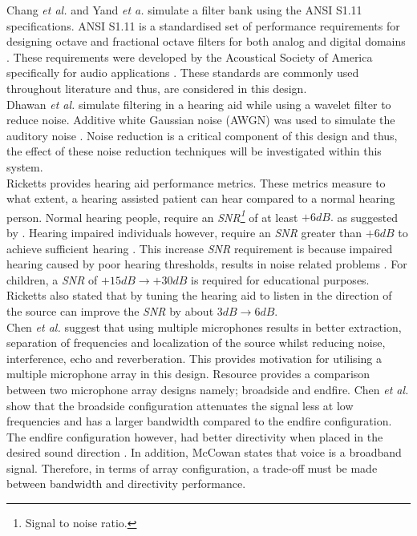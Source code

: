 \documentclass[12pt, onecolumn]{article}
\begin{document}
\newline
\noindent Chang \textit{et al.} \cite{chang} and Yand \textit{et a.} \cite{ansiAtten} simulate a filter bank using the ANSI S1.11 specifications. ANSI S1.11 is a standardised set of performance requirements for designing octave and fractional octave filters for both analog and digital domains \cite{ansiDoc}. These requirements were developed by the Acoustical Society of America specifically for audio applications \cite{ansiDoc}. These standards are commonly used throughout literature and thus, are considered in this design.\\
\newline
\noindent Dhawan \textit{et al.} simulate filtering in a hearing aid while using a wavelet filter to reduce noise. Additive white Gaussian noise (AWGN) was used to simulate the auditory noise \cite{dhawan}. Noise reduction is a critical component of this design and thus, the effect of these noise reduction techniques will be investigated within this system. \\
\newline
\noindent Ricketts \cite{ricketts} provides hearing aid performance metrics. These metrics measure to what extent, a hearing assisted patient can hear compared to a normal hearing person. Normal hearing people, require an \textit{SNR\footnote{Signal to noise ratio.}} of at least $+6dB.$ as suggested by \cite{moore}. Hearing impaired individuals however, require an \textit{SNR} greater than $+6dB$ to achieve sufficient hearing \cite{tillman}. This increase \textit{SNR} requirement is because impaired hearing caused by poor hearing thresholds, results in noise related problems \cite{ricketts}. For children, a \textit{SNR} of $+15dB \rightarrow +30dB$ is required for educational purposes. Ricketts also stated that by tuning the hearing aid to listen in the direction of the source can improve the \textit{SNR} by about $3dB \rightarrow 6dB$.\\
\newline
\noindent Chen \textit{et al.} \cite{present} suggest that using multiple microphones results in better extraction, separation of frequencies and localization of the source whilst reducing noise, interference, echo and reverberation. This provides motivation for utilising a multiple microphone array in this design. Resource \cite{broadEnd} provides a comparison between two microphone array designs namely; broadside and endfire. Chen \textit{et al.} show that the broadside configuration attenuates the signal less at low frequencies and has a larger bandwidth compared to the endfire configuration. The endfire configuration however, had better directivity when placed in the desired sound direction \cite{broadEnd}. In addition, McCowan \cite{mccowan} states that voice is a broadband signal. Therefore, in terms of array configuration, a trade-off must be made between bandwidth and directivity performance.  \\
\end{document}
